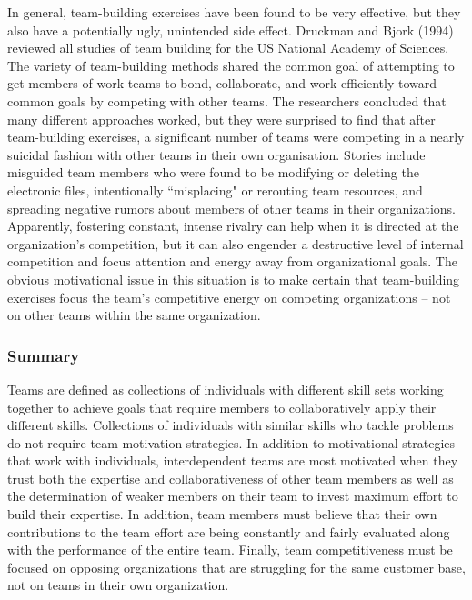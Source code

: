 In general, team-building exercises have been found to be very effective, but they also have a potentially ugly, unintended side effect. Druckman and Bjork (1994) reviewed all studies of team building for the US National Academy of Sciences. The variety of team-building methods shared the common goal of attempting to get members of work teams to bond, collaborate, and work efficiently toward common goals by competing with other teams. The researchers concluded that many different approaches worked, but they were surprised to find that after team-building exercises, a significant number of teams were competing in a nearly suicidal fashion with other teams in their own organisation. Stories include misguided team members who were found to be modifying or deleting the electronic files, intentionally ``misplacing" or rerouting team resources, and spreading negative rumors about members of other teams in their organizations. Apparently, fostering constant, intense rivalry can help when it is directed at the organization’s competition, but it can also engender a destructive level of internal competition and focus attention and energy away from organizational goals. The obvious motivational issue in this situation is to make certain that team-building exercises focus the team’s competitive energy on competing organizations -- not on other teams within the same organization.

\subsubsection{Summary}

Teams are defined as collections of individuals with different skill sets working together to achieve goals that require members to collaboratively apply their different skills. Collections of individuals with similar skills who tackle problems do not require team motivation strategies. In addition to motivational strategies that work with individuals, interdependent teams are most motivated when they trust both the expertise and collaborativeness of other team members as well as the determination of weaker members on their team to invest maximum effort to build their expertise. In addition, team members must believe that their own contributions to the team effort are being constantly and fairly evaluated along with the performance of the entire team. Finally, team competitiveness must be focused on opposing organizations that are struggling for the same customer base, not on teams in their own organization.
